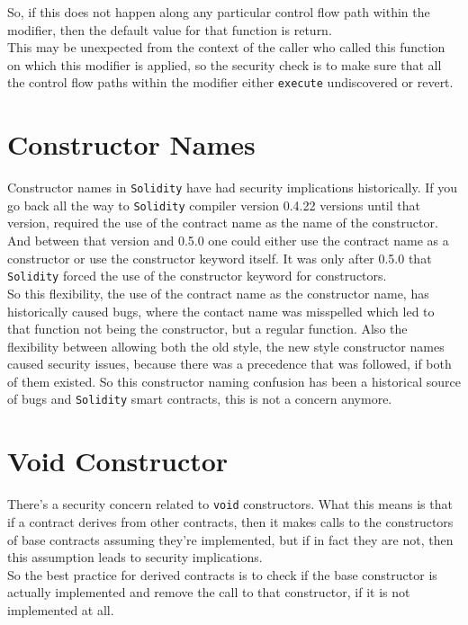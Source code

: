 So, if this does not happen along any particular control flow path within the modifier, then the default value for that function is return.\\ 

This may be unexpected from the context of the caller who called this function on which this modifier is applied, so the security check is to make sure that all the control flow paths within the modifier either \texttt{execute} undiscovered or revert.

\section{Constructor Names}

Constructor names in \texttt{Solidity} have had security implications historically. If you go back all the way to \texttt{Solidity} compiler version 0.4.22 versions until that version, required the use of the contract name as the name of the constructor. And between that version and 0.5.0 one could either use the contract name as a constructor or use the constructor keyword itself. It was only after 0.5.0 that \texttt{Solidity} forced the use of the constructor keyword for constructors.\\ 

So this flexibility, the use of the contract name as the constructor name, has historically caused bugs, where the contact name was misspelled which led to that function not being the constructor, but a regular function. Also the flexibility between allowing both the old style, the new style constructor names caused security issues, because there was a precedence that was followed, if both of them existed. So this constructor naming confusion has been a historical source of bugs and \texttt{Solidity} smart contracts, this is not a concern anymore.

\section{Void Constructor}

There's a security concern related to \texttt{void} constructors. What this means is that if a contract derives from other contracts, then it makes calls to the constructors of base contracts assuming they're implemented, but if in fact they are not, then this assumption leads to security implications.\\

So the best practice for derived contracts is to check if the base constructor is actually implemented and remove the call to that constructor, if it is not implemented at all.

